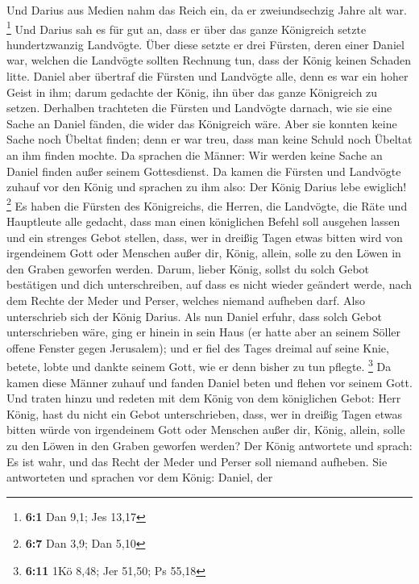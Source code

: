  Und Darius aus Medien nahm das Reich ein, da er
zweiundsechzig Jahre alt war. \footnote{\textbf{6:1} Dan 9,1; Jes 13,17}
 Und Darius sah es für gut an, dass er über das ganze
Königreich setzte hundertzwanzig Landvögte.  Über diese
setzte er drei Fürsten, deren einer Daniel war, welchen die Landvögte
sollten Rechnung tun, dass der König keinen Schaden litte.
 Daniel aber übertraf die Fürsten und Landvögte alle, denn
es war ein hoher Geist in ihm; darum gedachte der König, ihn über das
ganze Königreich zu setzen.  Derhalben trachteten die
Fürsten und Landvögte darnach, wie sie eine Sache an Daniel fänden, die
wider das Königreich wäre. Aber sie konnten keine Sache noch Übeltat
finden; denn er war treu, dass man keine Schuld noch Übeltat an ihm
finden mochte.  Da sprachen die Männer: Wir werden keine
Sache an Daniel finden außer seinem Gottesdienst.  Da
kamen die Fürsten und Landvögte zuhauf vor den König und sprachen zu ihm
also: Der König Darius lebe ewiglich! \footnote{\textbf{6:7} Dan 3,9;
  Dan 5,10}  Es haben die Fürsten des Königreichs, die
Herren, die Landvögte, die Räte und Hauptleute alle gedacht, dass man
einen königlichen Befehl soll ausgehen lassen und ein strenges Gebot
stellen, dass, wer in dreißig Tagen etwas bitten wird von irgendeinem
Gott oder Menschen außer dir, König, allein, solle zu den Löwen in den
Graben geworfen werden.  Darum, lieber König, sollst du
solch Gebot bestätigen und dich unterschreiben, auf dass es nicht wieder
geändert werde, nach dem Rechte der Meder und Perser, welches niemand
aufheben darf.  Also unterschrieb sich der König Darius.
 Als nun Daniel erfuhr, dass solch Gebot unterschrieben
wäre, ging er hinein in sein Haus (er hatte aber an seinem Söller offene
Fenster gegen Jerusalem); und er fiel des Tages dreimal auf seine Knie,
betete, lobte und dankte seinem Gott, wie er denn bisher zu tun pflegte.
\footnote{\textbf{6:11} 1Kö 8,48; Jer 51,50; Ps 55,18} 
Da kamen diese Männer zuhauf und fanden Daniel beten und flehen vor
seinem Gott.  Und traten hinzu und redeten mit dem König
von dem königlichen Gebot: Herr König, hast du nicht ein Gebot
unterschrieben, dass, wer in dreißig Tagen etwas bitten würde von
irgendeinem Gott oder Menschen außer dir, König, allein, solle zu den
Löwen in den Graben geworfen werden? Der König antwortete und sprach: Es
ist wahr, und das Recht der Meder und Perser soll niemand aufheben.
 Sie antworteten und sprachen vor dem König: Daniel, der
